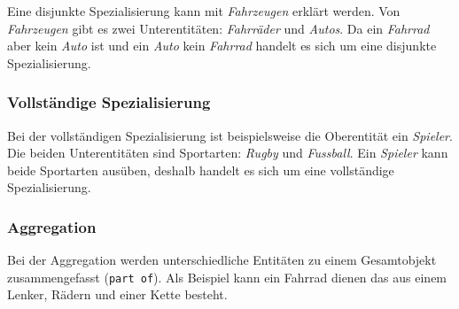 Eine disjunkte Spezialisierung kann mit \emph{Fahrzeugen} erklärt werden. Von \emph{Fahrzeugen} gibt es zwei Unterentitäten: \emph{Fahrräder} und \emph{Autos}. Da ein \emph{Fahrrad} aber kein \emph{Auto} ist und ein \emph{Auto} kein \emph{Fahrrad} handelt es sich um eine disjunkte Spezialisierung.

\subsubsection{Vollständige Spezialisierung}

Bei der vollständigen Spezialisierung ist beispielsweise die Oberentität ein \emph{Spieler}. Die beiden Unterentitäten sind Sportarten: \emph{Rugby} und \emph{Fussball}. Ein \emph{Spieler} kann beide Sportarten ausüben, deshalb handelt es sich um eine vollständige Spezialisierung. 

\subsubsection{Aggregation}

Bei der Aggregation werden unterschiedliche Entitäten zu einem Gesamtobjekt zusammengefasst (\verb|part of|). Als Beispiel kann ein Fahrrad dienen das aus einem Lenker, Rädern und einer Kette besteht.